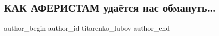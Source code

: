  
 
 
 
 
 
\subsection{КАК АФЕРИСТАМ удаётся нас обмануть…}
\label{sec:27_05_2021.fb.titarenko_lubov.1.aferisty_obman}
\ifcmt
 author_begin
   author_id titarenko_lubov
 author_end
\fi

